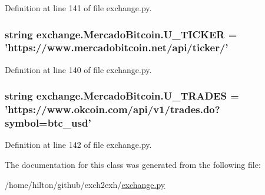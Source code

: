 Definition at line 141 of file exchange.\-py.

\hypertarget{classexchange_1_1_mercado_bitcoin_a310b7df5ae9e8a46bad918428c67d4e8}{
\subsubsection[{U\-\_\-\-T\-I\-C\-K\-E\-R}]{\setlength{\rightskip}{0pt plus 5cm}string exchange.\-Mercado\-Bitcoin.\-U\-\_\-\-T\-I\-C\-K\-E\-R = 'https\-://www.\-mercadobitcoin.\-net/api/{\bf ticker}/'\hspace{0.3cm}{\ttfamily [static]}}}\label{classexchange_1_1_mercado_bitcoin_a310b7df5ae9e8a46bad918428c67d4e8}


Definition at line 140 of file exchange.\-py.

\hypertarget{classexchange_1_1_mercado_bitcoin_a20ad6407ef07ab8a55d3c022d1512a5d}{
\subsubsection[{U\-\_\-\-T\-R\-A\-D\-E\-S}]{\setlength{\rightskip}{0pt plus 5cm}string exchange.\-Mercado\-Bitcoin.\-U\-\_\-\-T\-R\-A\-D\-E\-S = 'https\-://www.\-okcoin.\-com/api/v1/trades.\-do?symbol=btc\-\_\-usd'\hspace{0.3cm}{\ttfamily [static]}}}\label{classexchange_1_1_mercado_bitcoin_a20ad6407ef07ab8a55d3c022d1512a5d}


Definition at line 142 of file exchange.\-py.



The documentation for this class was generated from the following file\-:\begin{DoxyCompactItemize}
\item 
/home/hilton/github/exch2exh/\hyperlink{exchange_8py}{exchange.\-py}\end{DoxyCompactItemize}
